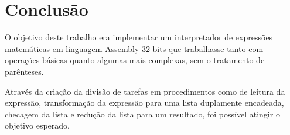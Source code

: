 \documentclass[12pt]{article}
\begin{document}
\section*{Conclusão}

O objetivo deste trabalho era implementar um interpretador de expressões matemáticas em linguagem Assembly 32 bits que trabalhasse tanto com  operações básicas quanto algumas mais complexas, sem o tratamento de parênteses.

Através da criação da divisão de tarefas em procedimentos como de leitura da expressão, transformação da expressão para uma lista duplamente encadeada, checagem da lista e redução da lista para um resultado, foi possível atingir o objetivo esperado.

\nocite{*}



\end{document}
